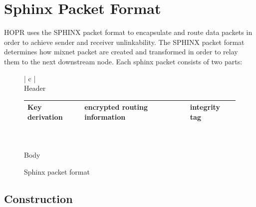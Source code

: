 \section{Sphinx Packet Format}

HOPR uses the SPHINX packet format to encapsulate and route data packets in order to achieve sender and receiver unlinkability. The SPHINX packet format determines how mixnet packet are created and transformed in order to relay them to the next downstream node. Each sphinx packet consists of two parts:
\begin{figure}[H]
    \begin{center}
        \begin{tabular}{| c |}
            \hline
            \\[-0.8em]
            Header                    \\[0.2em]
            \begin{tabular}{| m{} | m{} | m{} |}
                \hline
                Key derivation & encrypted routing information & integrity tag \\
                \hline
            \end{tabular} \\[0.9em]
            \hline
            \hline
            \\[-0.7em]
            Body                      \\[1.0em]
            \hline
        \end{tabular}
    \end{center}
    \label{fig:Sphinx packet format}
    \caption{Sphinx packet format}
\end{figure}

\subsection{Construction}

